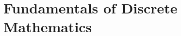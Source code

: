 \documentclass{book}
\begin{document}

%


%

\tableofcontents

\part{Fundamentals of Discrete Mathematics}

\end{document}
